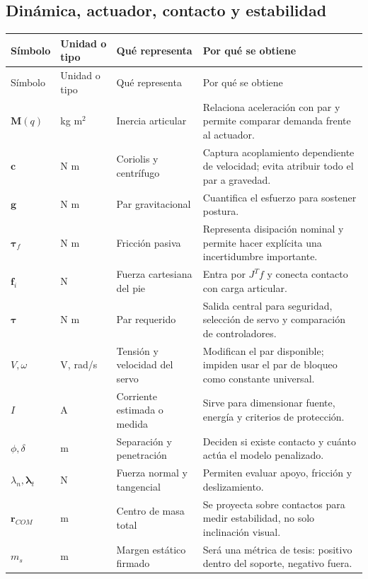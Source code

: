 \documentclass[11pt,letterpaper]{article}
\newcommand{\vect}[1]{\bm{#1}}
\newcommand{\mat}[1]{\bm{#1}}
\begin{document}
\subsection{Dinámica, actuador, contacto y estabilidad}
\footnotesize
\begin{longtable}{p{2.2cm}p{1.7cm}p{3.9cm}p{5.5cm}}
\toprule Símbolo&Unidad o tipo&Qué representa&Por qué se obtiene\\\midrule\endfirsthead
\toprule Símbolo&Unidad o tipo&Qué representa&Por qué se obtiene\\\midrule\endhead
$\mat M(q)$&kg m$^2$&Inercia articular&Relaciona aceleración con par y permite
comparar demanda frente al actuador.\\
$\vect c$&N m&Coriolis y centrífugo&Captura acoplamiento dependiente de velocidad;
evita atribuir todo el par a gravedad.\\
$\vect g$&N m&Par gravitacional&Cuantifica el esfuerzo para sostener postura.\\
$\vect\tau_f$&N m&Fricción pasiva&Representa disipación nominal y permite hacer
explícita una incertidumbre importante.\\
$\vect f_i$&N&Fuerza cartesiana del pie&Entra por $J^Tf$ y conecta contacto con
carga articular.\\
$\vect\tau$&N m&Par requerido&Salida central para seguridad, selección de servo
y comparación de controladores.\\
$V,\omega$&V, rad/s&Tensión y velocidad del servo&Modifican el par disponible;
impiden usar el par de bloqueo como constante universal.\\
$I$&A&Corriente estimada o medida&Sirve para dimensionar fuente, energía y
criterios de protección.\\
$\phi,\delta$&m&Separación y penetración&Deciden si existe contacto y cuánto
actúa el modelo penalizado.\\
$\lambda_n,\vect\lambda_t$&N&Fuerza normal y tangencial&Permiten evaluar apoyo,
fricción y deslizamiento.\\
$\vect r_{COM}$&m&Centro de masa total&Se proyecta sobre contactos para medir
estabilidad, no solo inclinación visual.\\
$m_s$&m&Margen estático firmado&Será una métrica de tesis: positivo dentro del
soporte, negativo fuera.\\
\bottomrule
\end{longtable}
\normalsize
\end{document}
